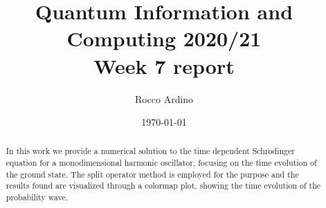 \documentclass[pra, onecolumn, notitlepage, floats, 11pt]{revtex4-1}
\begin{document}
\title{Quantum Information and Computing 2020/21\\Week 7 report}

\author{Rocco Ardino}

\date{\today}





\begin{abstract}
    In this work we provide a numerical solution to the time dependent Schr$\mathrm{\ddot{o}}$dinger equation for a monodimensional harmonic oscillator, focusing on the time evolution of the ground state. The split operator method is employed for the purpose and the results found are visualized through a colormap plot, showing the time evolution of the probability wave.
\end{abstract}

\maketitle
\end{document}
